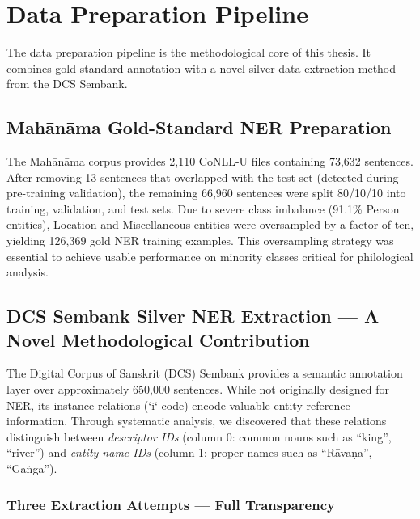 \section{Data Preparation Pipeline}
\label{sec:data_preparation}

The data preparation pipeline is the methodological core of this thesis. It combines gold-standard annotation with a novel silver data extraction method from the DCS Sembank.

\subsection{Mahānāma Gold-Standard NER Preparation}
\label{subsec:mahanama_gold}

The Mahānāma corpus \cite{sarkar2025mahanama} provides 2,110 CoNLL-U files containing 73,632 sentences. After removing 13 sentences that overlapped with the test set (detected during pre-training validation), the remaining 66,960 sentences were split 80/10/10 into training, validation, and test sets. Due to severe class imbalance (91.1\% Person entities), Location and Miscellaneous entities were oversampled by a factor of ten, yielding 126,369 gold NER training examples. This oversampling strategy was essential to achieve usable performance on minority classes critical for philological analysis.

\subsection{DCS Sembank Silver NER Extraction — A Novel Methodological Contribution}
\label{subsec:dcs_sembank}

The Digital Corpus of Sanskrit (DCS) Sembank \cite{hellwig2010dcs} provides a semantic annotation layer over approximately 650,000 sentences. While not originally designed for NER, its instance relations (`i` code) encode valuable entity reference information. Through systematic analysis, we discovered that these relations distinguish between \textit{descriptor IDs} (column 0: common nouns such as ``king'', ``river'') and \textit{entity name IDs} (column 1: proper names such as ``Rāvaṇa'', ``Gaṅgā'').

\subsubsection{Three Extraction Attempts — Full Transparency}

